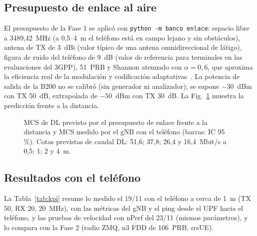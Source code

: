 \documentclass[conference]{IEEEtran}
\providecommand{\datosgraficamcs}{\addplot[red,only marks,mark=square*,error bars/.cd,y dir=both,y explicit]
  coordinates {(1,25) +- (0,1)};\addlegendentry{Medido 19/11 (MCS 24--26)}}
\begin{document}
\subsection{Presupuesto de enlace al aire}
El presupuesto de la Fase 1 se aplicó con \texttt{python -m banco enlace}: espacio libre a 3489{,}42~MHz (a 0{,}5--4~m el teléfono está en campo lejano y sin obstáculos), antena de TX de 3~dBi (valor típico de una antena omnidireccional de látigo), figura de ruido del teléfono de 9~dB (valor de referencia para terminales en las evaluaciones del 3GPP), 51~PRB y Shannon atenuado con $\alpha=0{,}6$, que aproxima la eficiencia real de la modulación y codificación adaptativas~\cite{tr36942}. La potencia de salida de la B200 no se calibró (sin generador ni analizador); se supone $-30$~dBm con TX 50~dB, extrapolada de $-50$~dBm con TX 30~dB. La Fig.~\ref{fig:enlace} muestra la predicción frente a la distancia.

\begin{figure}[!t]
\centering
{}
\caption{MCS de DL previsto por el presupuesto de enlace frente a la distancia y MCS medido por el gNB con el teléfono (barras: IC 95\,\%). Cotas previstas de caudal DL: 51{,}6; 37{,}8; 26{,}4 y 16{,}4~Mbit/s a 0{,}5; 1; 2 y 4~m.}
\label{fig:enlace}
\end{figure}

\subsection{Resultados con el teléfono}
La Tabla~\ref{tab:kpi} resume lo medido el 19/11 con el teléfono a cerca de 1~m (TX 50, RX 20, 20~MHz), con las métricas del gNB y el ping desde el UPF hacia el teléfono, y las pruebas de velocidad con nPerf del 23/11 (mismos parámetros), y lo compara con la Fase 2 (radio ZMQ, n3 FDD de 106~PRB, srsUE).
\end{document}
